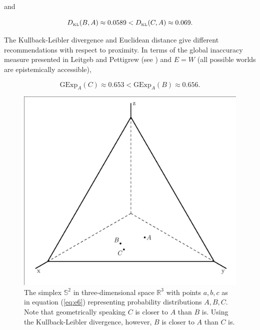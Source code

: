 \documentclass[smallextended]{svjour3}       %
\begin{document}
and

\begin{equation}
  \label{eq:e9}
  D_{\mbox{\tiny KL}}(B,A)\approx{}0.0589<D_{\mbox{\tiny KL}}(C,A)\approx{}0.069.
\end{equation}

The Kullback-Leibler divergence and Euclidean distance give different
re\-commendations with respect to proximity. In terms of the global
inaccuracy measure presented in Leitgeb and Pettigrew (see
) and $E=W$ (all possible worlds
are epistemically accessible),

\begin{equation}
  \label{eq:e8a}
  \mbox{GExp}_{A}(C)\approx{}0.653<\mbox{GExp}_{A}(B)\approx{}0.656.
\end{equation}

\begin{figure}[ht]
  \begin{flushright}
    \begin{minipage}[h]{.7\linewidth}
      \includegraphics[width=\textwidth]{threepoints.eps}
      \caption{\footnotesize The simplex $\mathbb{S}^{2}$ in
        three-dimensional space $\mathbb{R}^{3}$ with points $a,b,c$
        as in equation (\ref{eq:e6}) representing probability
        distributions $A,B,C$. Note that geometrically speaking $C$ is
        closer to $A$ than $B$ is. Using the Kullback-Leibler
        divergence, however, $B$ is closer to $A$ than $C$ is.}
      \label{fig:threepoints}
    \end{minipage}
  \end{flushright}
\end{figure}
\end{document}
